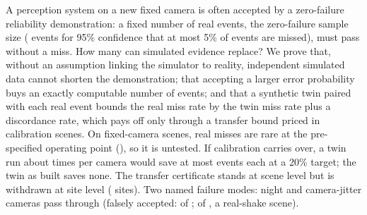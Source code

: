 A perception system on a new fixed camera is often accepted by a zero-failure reliability demonstration: a fixed number
of real events, the zero-failure sample size (\nNzero{} events for 95\% confidence that at most 5\% of events are
missed), must pass without a miss. How many can simulated evidence replace? We prove that,
without an assumption linking the simulator to reality, independent simulated data cannot shorten the demonstration;
that accepting a larger error probability buys an exactly computable number of events; and that a synthetic twin paired
with each real event bounds the real miss rate by the twin miss rate plus a discordance rate, which pays off only
through a transfer bound priced in calibration scenes. On \nMainScenes{} fixed-camera scenes, real misses are rare at the pre-specified operating point (\nPmainOPshort), so
it is untested. If calibration carries over, a twin run about \nTwinRunsOP{} times per camera would save at most \nSavedOP{} events each at a 20\% target; the twin as built saves none. The transfer certificate stands at scene level but is withdrawn at site level (\nSiteSm{} sites). Two named failure modes: night and
camera-jitter cameras pass through (falsely accepted: \nOODSNightfa{} of \nOODSNightcams{}; \nOODSJitfa{} of \nOODSJitcams{}, a real-shake scene).
